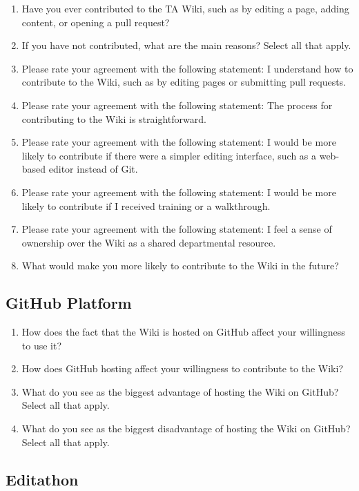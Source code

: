 \documentclass[11pt]{article}
\begin{document}
\begin{enumerate}
  \item Have you ever contributed to the TA Wiki, such as by editing a page, adding content, or opening a pull request?
  \item If you have not contributed, what are the main reasons? Select all that apply.
  \item Please rate your agreement with the following statement: I understand how to contribute to the Wiki, such as by editing pages or submitting pull requests.
  \item Please rate your agreement with the following statement: The process for contributing to the Wiki is straightforward.
  \item Please rate your agreement with the following statement: I would be more likely to contribute if there were a simpler editing interface, such as a web-based editor instead of Git.
  \item Please rate your agreement with the following statement: I would be more likely to contribute if I received training or a walkthrough.
  \item Please rate your agreement with the following statement: I feel a sense of ownership over the Wiki as a shared departmental resource.
  \item What would make you more likely to contribute to the Wiki in the future?
\end{enumerate}

\subsection{GitHub Platform}

\begin{enumerate}
  \item How does the fact that the Wiki is hosted on GitHub affect your willingness to use it?
  \item How does GitHub hosting affect your willingness to contribute to the Wiki?
  \item What do you see as the biggest advantage of hosting the Wiki on GitHub? Select all that apply.
  \item What do you see as the biggest disadvantage of hosting the Wiki on GitHub? Select all that apply.
\end{enumerate}

\subsection{Editathon}
\end{document}
